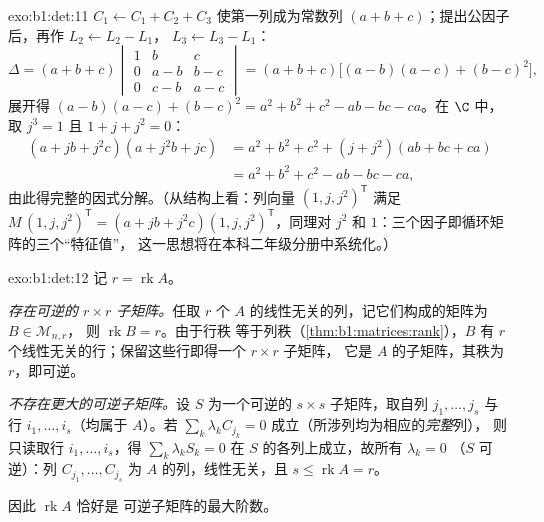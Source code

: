 \begin{solution}{exo:b1:det:11}
$C_1 \leftarrow C_1 + C_2 + C_3$ 使第一列成为常数列
$(a + b + c)$；提出公因子后，再作 $L_2 \leftarrow L_2 - L_1$，
$L_3 \leftarrow L_3 - L_1$：
\[
\Delta = (a+b+c)\begin{vmatrix}
1 & b & c\\
0 & a - b & b - c\\
0 & c - b & a - c
\end{vmatrix}
= (a+b+c)\bigl[(a-b)(a-c) + (b-c)^2\bigr],
\]
展开得 $(a-b)(a-c) + (b-c)^2 = a^2 + b^2 + c^2 - ab - bc
- ca$。在 $\C$ 中，取 $j^3 = 1$ 且 $1 + j + j^2 = 0$：
\begin{align*}
(a + jb + j^2c)(a + j^2b + jc)
&= a^2 + b^2 + c^2 + (j + j^2)(ab + bc + ca)\\
&= a^2 + b^2 + c^2 - ab - bc - ca ,
\end{align*}
由此得完整的因式分解。（从结构上看：列向量
$(1, j, j^2)^{\mathsf T}$ 满足 $M\,(1, j, j^2)^{\mathsf T}
= (a + jb + j^2c)(1, j, j^2)^{\mathsf T}$，同理对
$j^2$ 和 $1$：三个因子即循环矩阵的三个“特征值”，
这一思想将在本科二年级分册中系统化。）
\end{solution}

\begin{solution}{exo:b1:det:12}
记 $r = \operatorname{rk} A$。

\emph{存在可逆的 $r \times r$ 子矩阵。}任取 $r$ 个
$A$ 的线性无关的列，记它们构成的矩阵为 $B \in \mathcal{M}_{n,r}$，
则 $\operatorname{rk} B = r$。由于行秩
等于列秩（\cref{thm:b1:matrices:rank}），$B$ 有 $r$
个线性无关的行；保留这些行即得一个 $r \times r$ 子矩阵，
它是 $A$ 的子矩阵，其秩为 $r$，即可逆。

\emph{不存在更大的可逆子矩阵。}设 $S$ 为一个可逆的 $s \times s$
子矩阵，取自列 $j_1, \dots, j_s$ 与行 $i_1,
\dots, i_s$（均属于 $A$）。若 $\sum_k \lambda_k
C_{j_k} = 0$ 成立（所涉列均为相应的\emph{完整}列），
则只读取行 $i_1, \dots, i_s$，得 $\sum_k
\lambda_k S_k = 0$ 在 $S$ 的各列上成立，故所有 $\lambda_k = 0$
（$S$ 可逆）：列 $C_{j_1}, \dots, C_{j_s}$
为 $A$ 的列，线性无关，且 $s \leq \operatorname{rk} A = r$。

因此 $\operatorname{rk} A$ 恰好是
可逆子矩阵的最大阶数。
\end{solution}

